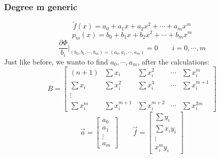    \subsubsection{Degree m generic}
    $$
    \tilde{f}(x)=a_0+a_1x+a_2x^2+\cdots+a_mx^m
    $$
    $$
    p_m(x)=b_0+b_1x+b_2x^2+\cdots+b_mx^m
    $$
    $$
    \frac{
        \partial\Phi
    }{b_i}\Big|_{(b_0,b_1,\cdots,b_m)=(a_0,a_1,\cdots,a_m)}=0\qquad i=0,\cdots,m
    $$
    Just like before, we wanto to find $a_0,\cdots,a_m$, after the calculations:
    $$
    B=\begin{bmatrix}
        (n+1) & \sum x_i & \sum x_i^2 & \cdots & \sum x_i^m\\
        \sum x_i & \sum x_i^2 & \sum x_i^3 & \cdots & \sum x_i^{m+1}\\
        \vdots\\
        \sum x_i^m & \sum x_i^{m+1} & \sum x_i^{m+2} & \cdots & \sum x_i^{2m}
    \end{bmatrix}
    $$
    $$
    \overrightarrow{a}=\begin{bmatrix}
        a_0\\
        a_1\\
        \vdots\\
        a_m
    \end{bmatrix}\qquad
    \overrightarrow{f}=\begin{bmatrix}
        \sum y_i\\
        \sum x_iy_i\\
        \vdots\\
        x_i^my_i
    \end{bmatrix}
    $$

